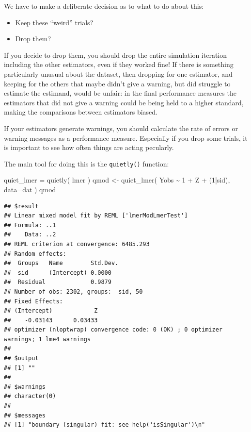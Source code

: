 \documentclass[
]{book}
\newenvironment{Shaded}{\begin{snugshade}}{\end{snugshade}}
\newcommand{\AttributeTok}[1]{\textcolor[rgb]{0.77,0.63,0.00}{#1}}
\newcommand{\DecValTok}[1]{\textcolor[rgb]{0.00,0.00,0.81}{#1}}
\newcommand{\FunctionTok}[1]{\textcolor[rgb]{0.00,0.00,0.00}{#1}}
\newcommand{\NormalTok}[1]{#1}
\newcommand{\OtherTok}[1]{\textcolor[rgb]{0.56,0.35,0.01}{#1}}
\newcommand{\SpecialCharTok}[1]{\textcolor[rgb]{0.00,0.00,0.00}{#1}}
\providecommand{\tightlist}{%
  \setlength{\itemsep}{0pt}\setlength{\parskip}{0pt}}
\begin{document}
We have to make a deliberate decision as to what to do about this:

\begin{itemize}
\tightlist
\item
  Keep these ``weird'' trials?
\item
  Drop them?
\end{itemize}

If you decide to drop them, you should drop the entire simulation iteration including the other estimators, even if they worked fine!
If there is something particularly unusual about the dataset, then dropping for one estimator, and keeping for the others that maybe didn't give a warning, but did struggle to estimate the estimand, would be unfair: in the final performance measures the estimators that did not give a warning could be being held to a higher standard, making the comparisons between estimators biased.

If your estimators generate warnings, you should calculate the rate of errors or warning messages as a performance measure.
Especially if you drop some trials, it is important to see how often things are acting pecularly.

The main tool for doing this is the \texttt{quietly()} function:

\begin{Shaded}
\begin{Highlighting}[]
\NormalTok{quiet\_lmer }\OtherTok{=} \FunctionTok{quietly}\NormalTok{( lmer )}
\NormalTok{qmod }\OtherTok{\textless{}{-}} \FunctionTok{quiet\_lmer}\NormalTok{( Yobs }\SpecialCharTok{\textasciitilde{}} \DecValTok{1} \SpecialCharTok{+}\NormalTok{ Z }\SpecialCharTok{+}\NormalTok{ (}\DecValTok{1}\SpecialCharTok{|}\NormalTok{sid), }\AttributeTok{data=}\NormalTok{dat )}
\NormalTok{qmod}
\end{Highlighting}
\end{Shaded}

\begin{verbatim}
## $result
## Linear mixed model fit by REML ['lmerModLmerTest']
## Formula: ..1
##    Data: ..2
## REML criterion at convergence: 6485.293
## Random effects:
##  Groups   Name        Std.Dev.
##  sid      (Intercept) 0.0000  
##  Residual             0.9879  
## Number of obs: 2302, groups:  sid, 50
## Fixed Effects:
## (Intercept)            Z  
##    -0.03143      0.03433  
## optimizer (nloptwrap) convergence code: 0 (OK) ; 0 optimizer warnings; 1 lme4 warnings 
## 
## $output
## [1] ""
## 
## $warnings
## character(0)
## 
## $messages
## [1] "boundary (singular) fit: see help('isSingular')\n"
\end{verbatim}
\end{document}
